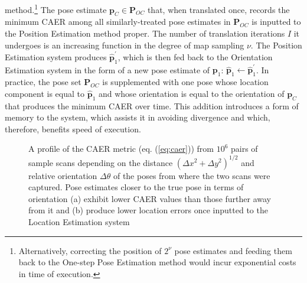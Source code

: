 method.\footnote{Alternatively, correcting the position of $2^\nu$ pose
estimates and feeding them back to the One-step Pose Estimation method would
incur exponential costs in time of execution.} The pose estimate $\bm{p}_C \in
\bm{P}_{OC}$ that, when translated once, records the minimum CAER among all
similarly-treated pose estimates in $\bm{P}_{OC}$ is inputted to the Position
Estimation method proper. The number of translation iterations $I$ it undergoes
is an increasing function in the degree of map sampling $\nu$.
The Position Estimation system produces $\hat{\bm{p}}_1^\prime$, which is then
fed back to the Orientation Estimation system in the form of a new pose
estimate of $\bm{p}_1$: $\hat{\bm{p}}_1 \leftarrow \hat{\bm{p}}_1^\prime$. In
practice, the pose set $\bm{P}_{OC}$ is supplemented with one pose whose
location component is equal to $\hat{\bm{p}}_1$ and whose orientation is equal
to the orientation of $\bm{p}_C$ that produces the minimum CAER over time. This
addition introduces a form of memory to the system, which assists it in
avoiding divergence and which, therefore, benefits speed of execution.

\begin{figure}[]\centering
  
  \vspace{1cm}
  \caption{\small A profile of the CAER metric (eq. (\ref{eq:caer})) from
           $10^6$ pairs of sample scans depending on the distance
           $(\Delta x^2 + \Delta y^2)^{1/2}$ and relative orientation
           $\Delta \theta$ of the poses from where the two scans were captured.
           Pose estimates closer to the true pose in terms of orientation
           (a) exhibit lower CAER values than those further away from it and (b)
           produce lower location errors once inputted to the Location
           Estimation system}
  \label{fig:caer}
\end{figure}

